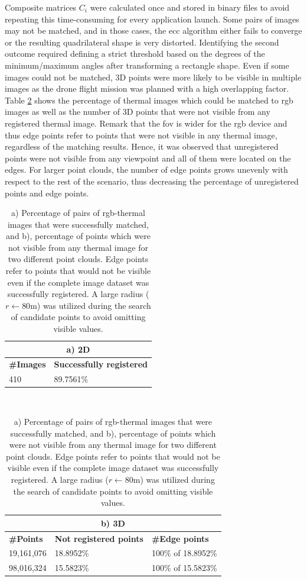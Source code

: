 Composite matrices $C_i$ were calculated once and stored in binary files to avoid repeating this time-consuming for every application launch. Some pairs of images may not be matched, and in those cases, the \acrshort{ecc} algorithm either fails to converge or the resulting quadrilateral shape is very distorted. Identifying the second outcome required defining a strict threshold based on the degrees of the minimum/maximum angles after transforming a rectangle shape. Even if some images could not be matched, 3D points were more likely to be visible in multiple images as the drone flight mission was planned with a high overlapping factor. Table \ref{table:image_registration_statistics} shows the percentage of thermal images which could be matched to \acrshort{rgb} images as well as the number of 3D points that were not visible from any registered thermal image. Remark that the \acrshort{fov} is wider for the \acrshort{rgb} device and thus edge points refer to points that were not visible in any thermal image, regardless of the matching results. Hence, it was observed that unregistered points were not visible from any viewpoint and all of them were located on the edges. For larger point clouds, the number of edge points grows unevenly with respect to the rest of the scenario, thus decreasing the percentage of unregistered points and edge points.

\begin{table}
    \sffamily
    \caption{a) Percentage of pairs of \acrshort{rgb}-thermal images that were successfully matched, and b), percentage of points which were not visible from any thermal image for two different point clouds. Edge points refer to points that would not be visible even if the complete image dataset was successfully registered. A large radius ($r \gets 80$\si{\meter}) was utilized during the search of candidate points to avoid omitting visible values.}
    \label{table:image_registration_statistics}
    \begin{tabular}{l@{\hskip 0.3in}l@{}}
        \multicolumn{2}{c}{a) 2D}\\
        \midrule
        \textbf{\#Images} & \textbf{Successfully registered}\\
        \midrule
        410 & 89.7561\% \\
        \bottomrule
    \end{tabular}\\[2mm]
    \begin{tabular}{l@{\hskip 0.3in}l@{\hskip 0.3in}l@{}}
        \multicolumn{3}{c}{b) 3D}\\
        \midrule
        \textbf{\#Points} & \textbf{Not registered points} & \textbf{\#Edge points}\\
        \midrule
        19,161,076 & 18.8952\% & 100\% of 18.8952\%\\
        98,016,324 & 15.5823\% & 100\% of 15.5823\%\\
        \bottomrule
    \end{tabular}
\end{table}

